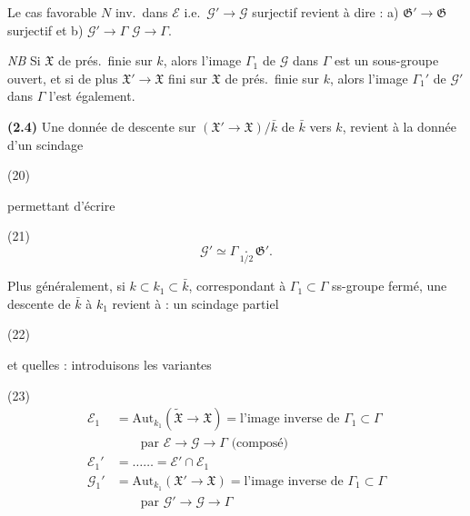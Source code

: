 \documentclass[11pt,a4paper]{article}
\begin{document}
Le cas favorable $N$ inv.\ dans $\mathcal{E}$ i.e.\ $\mathcal{G}' \to \mathcal{G}$ surjectif revient à dire : a) $\mathfrak{G}' \to \mathfrak{G}$ surjectif et b) $\mathcal{G}' \to \Gamma$    $\mathcal{G} \to \Gamma$.


\emph{NB} Si $\mathfrak{X}$ de prés.\ finie sur $k$, alors l'image $\Gamma_1$ de $\mathcal{G}$ dans $\Gamma$ est un sous-groupe ouvert, et si de plus $\mathfrak{X}' \to \mathfrak{X}$ fini sur $\mathfrak{X}$  de prés.\ finie sur $k$, alors l'image $\Gamma_1'$  de $\mathcal{G}'$ dans $\Gamma$ l'est également.

\textbf{(2.4)} \struck{\ill{}} Une donnée de descente sur $(\mathfrak{X}' \to \mathfrak{X})/\bar{k}$ de $\bar{k}$ vers $k$, revient à la donnée d'un scindage

(20)


permettant d'écrire

(21)
\[
  \mathcal{G}' \simeq \Gamma \underset{1/2}{\cdot} \mathfrak{G}' .
\]

Plus généralement, si $k \subset k_1 \subset \bar{k}$, correspondant à $\Gamma_1 \subset \Gamma$ ss-groupe fermé, une  descente de $\bar{k}$ à $k_1$ revient à : un scindage partiel

(22)


et quelles : introduisons les variantes


(23)
\[
  \begin{aligned}
    \mathcal{E}_1 &= \mathrm{Aut}_{k_1}(\widetilde{\mathfrak{X}} \to \mathfrak{X})
      = \text{l'image inverse de } \Gamma_1 \subset \Gamma \\
    &\qquad \text{par } \mathcal{E} \to \mathcal{G} \to \Gamma \text{ (composé)} \\
    \mathcal{E}_1' &= \ldots\ldots = \mathcal{E}' \cap \mathcal{E}_1 \\
    \mathcal{G}_1' &= \mathrm{Aut}_{k_1}(\mathfrak{X}' \to \mathfrak{X})
      = \text{l'image inverse de } \Gamma_1 \subset \Gamma \\
    &\qquad \text{par } \mathcal{G}' \to \mathcal{G} \to \Gamma
  \end{aligned}
\]
\end{document}
